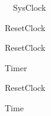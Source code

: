 
\begin{circus}%
  \circprocess\ ~SysClock ~\circdef~\circbegin
\end{circus}%
\begin{circusaction}
  ResetClock ~\circdef~\Skip
\end{circusaction}
\begin{circus}
  \circspot ResetClock
  \circend
\end{circus}

\begin{circus}%
  \circprocess  Timer  \circdef \circbegin
\end{circus}
\begin{circusaction}
  ResetClock  \circdef \Skip
\end{circusaction}
\begin{circusaction}
  Time  \circdef \Stop
\end{circusaction}
\begin{circus}
  \circspot \Skip
  \circend
\end{circus}